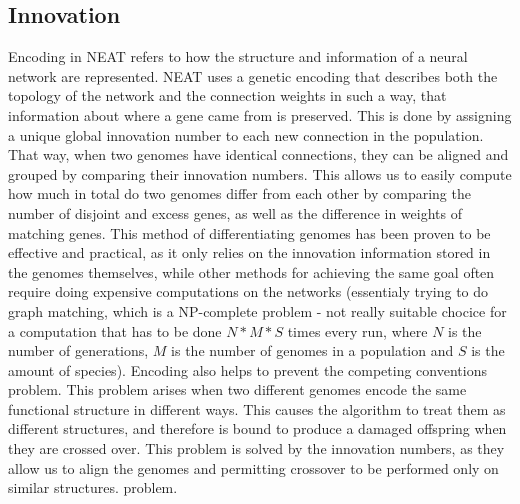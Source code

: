 \documentclass{article}
\begin{document}
\subsection{Innovation}
Encoding in NEAT refers to how the structure and information of a neural network are represented.
NEAT uses a genetic encoding that describes both the topology of the network and the connection weights in such a way, that information about
where a gene came from is preserved. This is done by assigning a unique global innovation number to each new connection in the population.
That way, when two genomes have identical connections, they can be aligned and grouped by comparing their innovation numbers. This allows us 
to easily compute how much in total do two genomes differ from each other by comparing the number of disjoint and excess genes, as well as the 
difference in weights of matching genes. This method of differentiating genomes has been proven to be effective and practical, as it only relies
on the innovation information stored in the genomes themselves, while other methods for achieving the same goal often require
doing expensive computations on the networks (essentialy trying to do graph matching, which is a NP-complete problem - not really suitable chocice
for a computation that has to be done $N*M*S$ times every run, where $N$ is the number of generations, $M$ is the number of genomes in a population
and $S$ is the amount of species).
Encoding also helps to prevent the competing conventions problem. This problem arises when two different genomes encode the same
functional structure in different ways. This causes the algorithm to treat them as different structures, and therefore is bound to produce a 
damaged offspring when they are crossed over. This problem is solved by the innovation numbers, as they allow us to align the genomes and
permitting crossover to be performed only on similar structures.
problem. 
\end{document}

